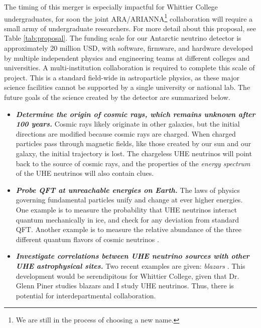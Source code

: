 \documentclass[../../main.tex]{subfiles}
\begin{document}
The timing of this merger is especially impactful for Whittier College undergraduates, for soon the joint ARA/ARIANNA\footnote{We are still in the process of choosing a new name.} collaboration will require a small army of undergraduate researchers.  For more detail about this proposal, see Table \ref{tab:proposal}.  The funding scale for our Antarctic neutrino detector is approximately 20 million USD, with software, firmware, and hardware developed by multiple independent physics and engineering teams at different colleges and universities.  A multi-institution collaboration is required to complete this scale of project.  This is a standard field-wide in astroparticle physics, as these major science facilities cannot be supported by a single university or national lab.  The future goals of the science created by the detector are summarized below. \\ \hspace{0.1cm}

\begin{itemize}
\item \textbf{\textit{Determine the origin of cosmic rays, which remains unknown after 100 years.}}  Cosmic rays likely originate in other galaxies, but the initial directions are modified because cosmic rays are charged.  When charged particles pass through magnetic fields, like those created by our sun and our galaxy, the initial trajectory is lost. The chargeless UHE neutrinos will point back to the source of cosmic rays, and the properties of the \textit{energy spectrum} of the UHE neutrinos will also contain clues.
\item \textbf{\textit{Probe QFT at unreachable energies on Earth.}}  The laws of physics governing fundamental particles unify and change at ever higher energies.  One example is to measure the probability that UHE neutrinos interact quantum mechanically in ice, and check for any deviation from standard QFT. Another example is to measure the relative abundance of the three different quantum flavors of cosmic neutrinos \cite{bustamante2017measurement} \cite{connolly2011calculation}. 
\item \textit{\textbf{Investigate correlations between UHE neutrino sources with other UHE astrophysical sites.}}  Two recent examples are given: \textit{blazars} \cite{eaat2890}.  This development would be serendipitous for Whittier College, given that Dr. Glenn Piner studies blazars \cite{piner2018multiepoch} and I study UHE neutrinos. Thus, there is potential for interdepartmental collaboration.
\end{itemize}
\end{document}
